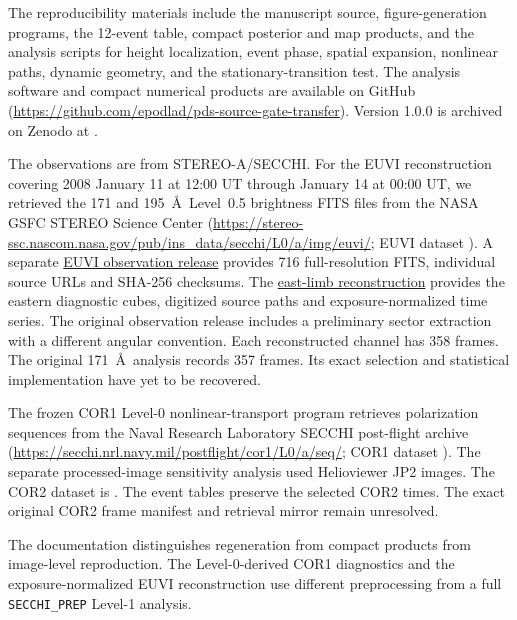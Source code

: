The reproducibility materials include the manuscript source, figure-generation
programs, the 12-event table, compact posterior and map products, and the
analysis scripts for height localization, event phase, spatial expansion,
nonlinear paths, dynamic geometry, and the stationary-transition test.
The analysis software and compact numerical products are available on GitHub
(\url{https://github.com/epodlad/pds-source-gate-transfer}). Version 1.0.0 is
archived on Zenodo at
.

The observations are from STEREO-A/SECCHI. For the EUVI reconstruction covering
2008 January 11 at 12:00 UT through January 14 at 00:00 UT, we retrieved the
171 and 195~\AA\ Level~0.5 brightness FITS files from the NASA GSFC STEREO
Science Center
(\url{https://stereo-ssc.nascom.nasa.gov/pub/ins_data/secchi/L0/a/img/euvi/};
EUVI dataset ).
A separate \href{https://github.com/epodlad/pds-source-gate-transfer/releases/tag/euvi-20080111-14-reconstruction-v1}{EUVI observation release}
provides 716 full-resolution FITS, individual source URLs and SHA-256 checksums.
The \href{https://github.com/epodlad/pds-source-gate-transfer/releases/tag/euvi-20080111-14-east-limb-v1}{east-limb reconstruction}
provides the eastern diagnostic cubes, digitized source paths and
exposure-normalized time series. The original observation release includes
a preliminary sector extraction with a different angular convention. Each reconstructed channel has 358 frames.
The original 171~\AA\ analysis records 357 frames. Its exact selection and
statistical implementation have yet to be recovered.

The frozen COR1 Level-0 nonlinear-transport program retrieves polarization
sequences from the Naval Research Laboratory SECCHI post-flight archive
(\url{https://secchi.nrl.navy.mil/postflight/cor1/L0/a/seq/};
COR1 dataset ).
The separate processed-image sensitivity analysis used Helioviewer JP2 images.
The COR2 dataset is
.
The event tables preserve the selected COR2 times. The exact original COR2
frame manifest and retrieval mirror remain unresolved.

The documentation distinguishes regeneration from compact products from
image-level reproduction. The Level-0-derived COR1 diagnostics and the
exposure-normalized EUVI reconstruction use different preprocessing from a
full \texttt{SECCHI\_PREP} Level-1 analysis.
